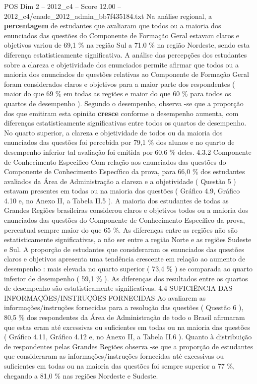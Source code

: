 \begin{textsample}{POS Dim 2 – 2012\_c4 – Score 12.00 – 2012\_c4/enade\_2012\_admin\_bb7f435184.txt}
Na análise regional, a \textbf{percentagem} de estudantes que avaliaram que todos ou a maioria dos enunciados das questões do Componente de Formação Geral estavam claros e objetivos variou de 69,1 \% na região Sul a 71.0 \% na região Nordeste, sendo esta diferença estatisticamente significativa.
A análise das percepções dos estudantes sobre a clareza e objetividade dos enunciados permite afirmar que todos ou a maioria dos enunciados de questões relativas ao Componente de Formação Geral foram considerados claros e objetivos para a maior parte dos respondentes ( maior do que 69 \% em todas as regiões e maior do que 60 \% para todos os quartos de desempenho ).
Segundo o desempenho, observa -se que a proporção dos que emitiram esta opinião \textbf{cresce} conforme o desempenho aumenta, com diferenças estatisticamente significativas entre todos os quartos de desempenho.
No quarto superior, a clareza e objetividade de todos ou da maioria dos enunciados das questões foi percebida por 79,1 \% dos alunos e no quarto de desempenho inferior tal avaliação foi emitida por 60,6 \% deles. 4.3.2 Componente de Conhecimento Específico Com relação aos enunciados das questões do Componente de Conhecimento Específico da prova, para 66,0 \% dos estudantes avaliados da Área de Administração a clareza e a objetividade ( Questão 5 ) estavam presentes em todas ou na maioria das questões ( Gráfico 4.9, Gráfico 4.10 e, no Anexo II, a Tabela II.5 ).
A maioria dos estudantes de todas as Grandes Regiões brasileiras considerou claros e objetivos todos ou a maioria dos enunciados das questões do Componente de Conhecimento Específico da prova, percentual sempre maior do que 65 \%.
As diferenças entre as regiões não são estatisticamente significativas, a não ser entre a região Norte e as regiões Sudeste e Sul.
A proporção de estudantes que consideraram os enunciados das questões claros e objetivos apresenta uma tendência crescente em relação ao aumento de desempenho : mais elevada no quarto superior ( 73,4 \% ) se comparada ao quarto inferior de desempenho ( 59,1 \% ).
As diferenças dos resultados entre os quartos de desempenho são estatisticamente significativas. 4.4 SUFICIÊNCIA DAS INFORMAÇÕES/INSTRUÇÕES FORNECIDAS Ao avaliarem as informações/instruções fornecidas para a resolução das questões ( Questão 6 ), 80,5 \% dos respondentes da Área de Administração de todo o Brasil afirmaram que estas eram até excessivas ou suficientes em todas ou na maioria das questões ( Gráfico 4.11, Gráfico 4.12 e, no Anexo II, a Tabela II.6 ).
Quanto à distribuição de respondentes pelas Grandes Regiões observa -se que a proporção de estudantes que consideraram as informações/instruções fornecidas até excessivas ou suficientes em todas ou na maioria das questões foi sempre superior a 77 \%, chegando a 81,0 \% nas regiões Nordeste e Sudeste.

\end{textsample}
